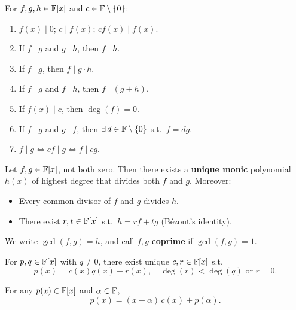 \begin{propbox}
For $f,g,h\in\mathbb{F}[x]$ and $c\in\mathbb{F}\setminus\{0\}$:
\begin{enumerate}
    \item $f(x)\mid 0$; \quad $c\mid f(x)$; \quad $cf(x)\mid f(x)$.
    \item If $f\mid g$ and $g\mid h$, then $f\mid h$.
    \item If $f\mid g$, then $f\mid g\cdot h$.
    \item If $f\mid g$ and $f\mid h$, then $f\mid (g+h)$.
    \item If $f(x)\mid c$, then $\deg(f)=0$.
    \item If $f\mid g$ and $g\mid f$, then $\exists\, d\in\mathbb{F}\setminus\{0\}$ s.t.\ $f=dg$.
    \item $f\mid g \iff cf\mid g \iff f\mid cg$.
\end{enumerate}
\end{propbox}

\begin{thmbox}
Let $f,g\in\mathbb{F}[x]$, not both zero.  Then there exists a \textbf{unique monic}
polynomial $h(x)$ of highest degree that divides both $f$ and $g$.  Moreover:
\begin{itemize}
    \item Every common divisor of $f$ and $g$ divides $h$.
    \item There exist $r,t\in\mathbb{F}[x]$ s.t.\ $h = rf + tg$ (Bézout's identity).
\end{itemize}
We write $\gcd(f,g)=h$, and call $f,g$ \textbf{coprime} if $\gcd(f,g)=1$.
\end{thmbox}

\begin{thmbox}
For $p,q\in\mathbb{F}[x]$ with $q\neq 0$, there exist unique $c,r\in\mathbb{F}[x]$ s.t.
\[
    p(x) = c(x)q(x) + r(x), \quad \deg(r) < \deg(q) \text{ or } r=0.
\]
\end{thmbox}

\begin{thmbox}
For any $p(x)\in\mathbb{F}[x]$ and $\alpha\in\mathbb{F}$,
\[
    p(x) = (x-\alpha)\,c(x) + p(\alpha).
\]
\end{thmbox}

